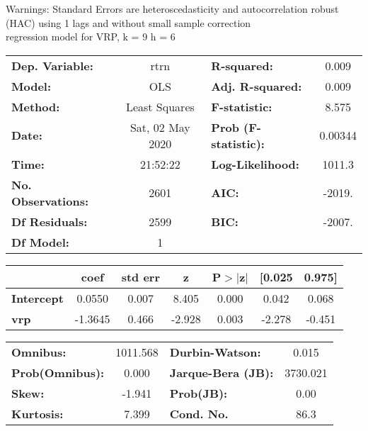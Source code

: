 Warnings: \newline
 [1] Standard Errors are heteroscedasticity and autocorrelation robust (HAC) using 1 lags and without small sample correction\\ 

regression model for VRP, k = 9 h = 6\begin{center}
\begin{tabular}{lclc}
\toprule
\textbf{Dep. Variable:}    &       rtrn       & \textbf{  R-squared:         } &     0.009   \\
\textbf{Model:}            &       OLS        & \textbf{  Adj. R-squared:    } &     0.009   \\
\textbf{Method:}           &  Least Squares   & \textbf{  F-statistic:       } &     8.575   \\
\textbf{Date:}             & Sat, 02 May 2020 & \textbf{  Prob (F-statistic):} &  0.00344    \\
\textbf{Time:}             &     21:52:22     & \textbf{  Log-Likelihood:    } &    1011.3   \\
\textbf{No. Observations:} &        2601      & \textbf{  AIC:               } &    -2019.   \\
\textbf{Df Residuals:}     &        2599      & \textbf{  BIC:               } &    -2007.   \\
\textbf{Df Model:}         &           1      & \textbf{                     } &             \\
\bottomrule
\end{tabular}
\begin{tabular}{lcccccc}
                   & \textbf{coef} & \textbf{std err} & \textbf{z} & \textbf{P$> |$z$|$} & \textbf{[0.025} & \textbf{0.975]}  \\
\midrule
\textbf{Intercept} &       0.0550  &        0.007     &     8.405  &         0.000        &        0.042    &        0.068     \\
\textbf{vrp}       &      -1.3645  &        0.466     &    -2.928  &         0.003        &       -2.278    &       -0.451     \\
\bottomrule
\end{tabular}
\begin{tabular}{lclc}
\textbf{Omnibus:}       & 1011.568 & \textbf{  Durbin-Watson:     } &    0.015  \\
\textbf{Prob(Omnibus):} &   0.000  & \textbf{  Jarque-Bera (JB):  } & 3730.021  \\
\textbf{Skew:}          &  -1.941  & \textbf{  Prob(JB):          } &     0.00  \\
\textbf{Kurtosis:}      &   7.399  & \textbf{  Cond. No.          } &     86.3  \\
\bottomrule
\end{tabular}
\end{center}

